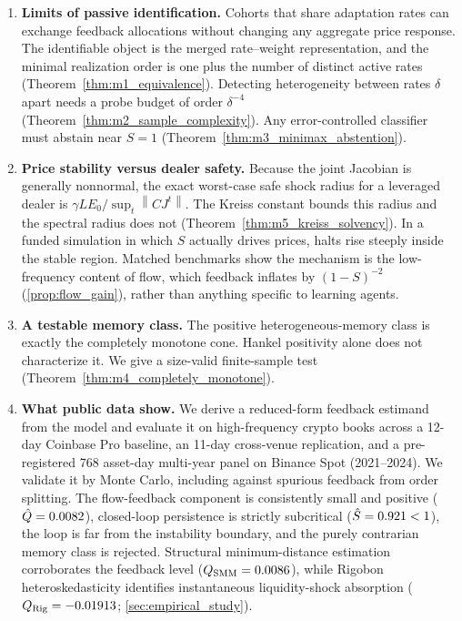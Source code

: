 \documentclass[10pt,twocolumn,letterpaper]{article}
\theoremstyle{definition}
\theoremstyle{remark}
\newcommand{\norm}[1]{\left\lVert #1\right\rVert}
\begin{document}
\begin{enumerate}[leftmargin=*]
    \item \textbf{Limits of passive identification.} Cohorts that share adaptation rates can exchange feedback allocations without changing any aggregate price response. The identifiable object is the merged rate--weight representation, and the minimal realization order is one plus the number of distinct active rates (Theorem~\ref{thm:m1_equivalence}). Detecting heterogeneity between rates $\delta$ apart needs a probe budget of order $\delta^{-4}$ (Theorem~\ref{thm:m2_sample_complexity}). Any error-controlled classifier must abstain near $S=1$ (Theorem~\ref{thm:m3_minimax_abstention}).

    \item \textbf{Price stability versus dealer safety.} Because the joint Jacobian is generally nonnormal, the exact worst-case safe shock radius for a leveraged dealer is $\gamma LE_0/\sup_t\norm{CJ^t}$. The Kreiss constant bounds this radius and the spectral radius does not (Theorem~\ref{thm:m5_kreiss_solvency}). In a funded simulation in which $S$ actually drives prices, halts rise steeply inside the stable region. Matched benchmarks show the mechanism is the low-frequency content of flow, which feedback inflates by $(1-S)^{-2}$ (\cref{prop:flow_gain}), rather than anything specific to learning agents.

    \item \textbf{A testable memory class.} The positive heterogeneous-memory class is exactly the completely monotone cone. Hankel positivity alone does not characterize it. We give a size-valid finite-sample test (Theorem~\ref{thm:m4_completely_monotone}).

    \item \textbf{What public data show.} We derive a reduced-form feedback estimand from the model and evaluate it on high-frequency crypto books across a 12-day Coinbase Pro baseline, an 11-day cross-venue replication, and a pre-registered 768 asset-day multi-year panel on Binance Spot (2021--2024). We validate it by Monte Carlo, including against spurious feedback from order splitting. The flow-feedback component is consistently small and positive ($\hat Q = 0.0082$), closed-loop persistence is strictly subcritical ($\hat S = 0.921 < 1$), the loop is far from the instability boundary, and the purely contrarian memory class is rejected. Structural minimum-distance estimation corroborates the feedback level ($Q_{\text{SMM}} = 0.0086$), while Rigobon heteroskedasticity identifies instantaneous liquidity-shock absorption ($Q_{\text{Rig}} = -0.01913$; \cref{sec:empirical_study}).
\end{enumerate}
\end{document}
